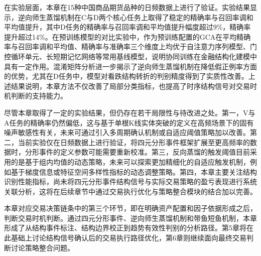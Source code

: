 在实验层面，本章在15种中国商品期货品种的日频数据上进行了验证。实验结果显示，逆向师生蒸馏机制在C与D两个核心任务上取得了稳定的精确率与召回率调和平均值提升，其中D任务的精确率与召回率调和平均值提升幅度超过9\%，精确率提升超过14\%。在预训练模型的对比实验中，作为预训练配置的GCA在平均精确率与召回率调和平均值、精确率与准确率三个维度上均优于自注意力序列模型、门控循环单元、长短期记忆网络等常用基线模型，说明协同训练在金融结构化建模中具有一定作用。混淆矩阵分析进一步揭示了逆向师生蒸馏机制在降低假正例率方面的优势，尤其在D任务中，模型对看跌结构转折的判别精度得到了实质性改善。上述结果说明，本章方法不仅改善了局部分类指标，也提高了时序结构信号对交易时机判断的支持能力。

尽管本章取得了一定的实验结果，但仍存在若干局限性与待改进之处。第一，V与A任务的精确率仍然偏低，这与基于单根K线实体突破的定义在高频场景下的固有噪声敏感性有关，未来可通过引入多周期确认机制或自适应阈值策略加以改善。第二，当前实验仅在日频数据上进行验证，将四元分形事件框架扩展至更高频率的数据时，分形事件的定义参数可能需要重新校准。第三，反向蒸馏的触发阈值目前采用的是基于组内均值的动态策略，未来可以探索更加精细化的自适应触发机制，例如基于梯度信息或特征空间多样性指标的动态调整策略。第四，本章主要关注结构识别性能指标，尚未将四元分形事件结构信号与实际交易策略的盈亏表现进行系统关联分析，这将在后续章节中通过交易执行优化与策略整合模块的结合加以完善。

本章对应交易决策链条中的第三个环节，即在明确资产配置和因子依据形成之后，判断交易时机判断。通过四元分形事件、逆向师生蒸馏机制和带鱼短鱼机制，本章形成了从结构事件标注、结构边界校正到趋势有效性判别的分析路径。第5章将在此基础上讨论结构信号确认后的交易执行路径优化，第6章则继续面向最终交易判断讨论策略整合问题。
